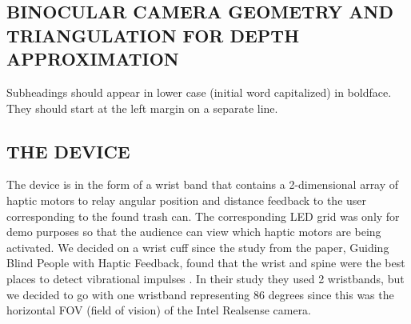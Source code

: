 \documentclass{article}
\begin{document}
\subsection{BINOCULAR CAMERA GEOMETRY AND TRIANGULATION FOR DEPTH APPROXIMATION}
\label{ssec:triangulation}

Subheadings should appear in lower case (initial word capitalized) in
boldface.  They should start at the left margin on a separate line.
 

\subsection{THE DEVICE}
\label{ssec:thedevice}

The device is in the form of a wrist band that contains a 2-dimensional array of haptic motors to relay angular position and distance feedback to the user corresponding to the found trash can. The corresponding LED grid was only for demo purposes so that the audience can view which haptic motors are being activated. We decided on a wrist cuff since the study from the paper, Guiding Blind People with Haptic Feedback, found that the wrist and spine were the best places to detect vibrational impulses \cite{guiding_blind}. In their study they used 2 wristbands, but we decided to go with one wristband representing 86 degrees since this was the horizontal FOV (field of vision) of the Intel Realsense camera.
\end{document}
